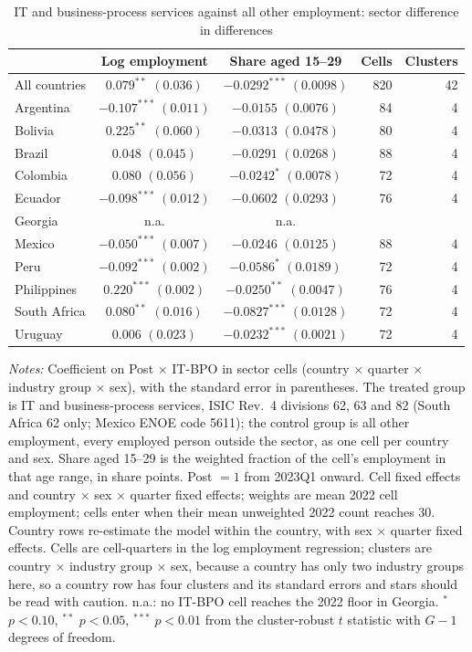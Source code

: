 \begin{table}[htbp]
\centering
\small
\setlength{\tabcolsep}{5pt}
\begin{threeparttable}
\caption{IT and business-process services against all other employment: sector difference in differences}
\label{tab:sector_total}
\begin{tabular}{lccrr}
\toprule
 & Log employment & Share aged 15--29 & Cells & Clusters \\
\midrule
All countries & $0.079^{**}$ $(0.036)$ & $-0.0292^{***}$ $(0.0098)$ & 820 & 42 \\
\midrule
Argentina & $-0.107^{***}$ $(0.011)$ & $-0.0155$ $(0.0076)$ & 84 & 4 \\
Bolivia & $0.225^{**}$ $(0.060)$ & $-0.0313$ $(0.0478)$ & 80 & 4 \\
Brazil & $0.048$ $(0.045)$ & $-0.0291$ $(0.0268)$ & 88 & 4 \\
Colombia & $0.080$ $(0.056)$ & $-0.0242^{*}$ $(0.0078)$ & 72 & 4 \\
Ecuador & $-0.098^{***}$ $(0.012)$ & $-0.0602$ $(0.0293)$ & 76 & 4 \\
Georgia & n.a. & n.a. &  &  \\
Mexico & $-0.050^{***}$ $(0.007)$ & $-0.0246$ $(0.0125)$ & 88 & 4 \\
Peru & $-0.092^{***}$ $(0.002)$ & $-0.0586^{*}$ $(0.0189)$ & 72 & 4 \\
Philippines & $0.220^{***}$ $(0.002)$ & $-0.0250^{**}$ $(0.0047)$ & 76 & 4 \\
South Africa & $0.080^{**}$ $(0.016)$ & $-0.0827^{***}$ $(0.0128)$ & 72 & 4 \\
Uruguay & $0.006$ $(0.023)$ & $-0.0232^{***}$ $(0.0021)$ & 72 & 4 \\
\bottomrule
\end{tabular}
\begin{tablenotes}[flushleft]
\footnotesize
\item \textit{Notes:} Coefficient on Post $\times$ IT-BPO in sector cells (country $\times$ quarter $\times$ industry group $\times$ sex), with the standard error in parentheses. The treated group is IT and business-process services, ISIC Rev.\ 4 divisions 62, 63 and 82 (South Africa 62 only; Mexico ENOE code 5611); the control group is all other employment, every employed person outside the sector, as one cell per country and sex. Share aged 15--29 is the weighted fraction of the cell's employment in that age range, in share points. Post $=1$ from 2023Q1 onward. Cell fixed effects and country $\times$ sex $\times$ quarter fixed effects; weights are mean 2022 cell employment; cells enter when their mean unweighted 2022 count reaches 30. Country rows re-estimate the model within the country, with sex $\times$ quarter fixed effects. Cells are cell-quarters in the log employment regression; clusters are country $\times$ industry group $\times$ sex, because a country has only two industry groups here, so a country row has four clusters and its standard errors and stars should be read with caution. n.a.: no IT-BPO cell reaches the 2022 floor in Georgia. $^{*}$ $p<0.10$, $^{**}$ $p<0.05$, $^{***}$ $p<0.01$ from the cluster-robust $t$ statistic with $G-1$ degrees of freedom.

\end{tablenotes}
\end{threeparttable}
\end{table}
